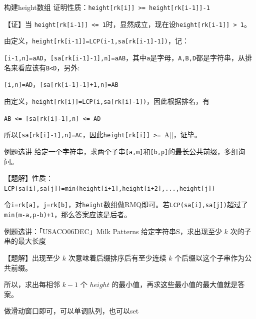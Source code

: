 \documentclass{beamer}
\begin{document}
\begin{frame}[fragile]{构建height数组}
    \small
    证明性质：\verb|height[rk[i]] >= height[rk[i-1]]-1|

    \pause \vspace{1em}
    【证】当 \verb|height[rk[i-1]] <= 1|时，显然成立，现在设\verb|height[rk[i-1]] > 1|。

    由定义，\verb|height[rk[i-1]]=LCP(i-1,sa[rk[i-1]-1])|，记：

    \verb|[i-1,n]=aAD|，\verb|[sa[rk[i-1]-1],n]=aAB|，其中\verb|a|是字母，\verb|A,B,D|都是字符串，从排名来看应该有\verb|B<D|，另外:

    \verb|[i,n]=AD|，\verb|[sa[rk[i-1]-1]+1,n]=AB|

    由定义，\verb|height[rk[i]]=LCP(i,sa[rk[i]-1])|，因此根据排名，有

    \verb|AB <= [sa[rk[i]-1],n] <= AD|

    所以\verb|[sa[rk[i]-1],n]=AC|，因此\verb|height[rk[i]] >= |A||，证毕。
\end{frame}

\begin{frame}[fragile]{例题选讲}
    \small
    给定一个字符串，求两个子串\verb|[a,m]|和\verb|[b,p]|的最长公共前缀，多组询问。

    \vspace{1em}\pause

    【题解】性质：\verb|LCP(sa[i],sa[j])=min(height[i+1],height[i+2],...,height[j])|

    \vspace{1em}\pause
    令\verb|i=rk[a]|，\verb|j=rk[b]|，对\verb|height|数组做RMQ即可。若\verb|LCP(sa[i],sa[j])|超过了\verb|min(m-a,p-b)+1|，那么答案应该是后者。
\end{frame}

\begin{frame}[fragile]{例题选讲：「USACO06DEC」Milk Patterns}
\small
给定字符串S，求出现至少 $k$ 次的子串的最大长度

\vspace{1em}\pause
【题解】出现至少 $k$ 次意味着后缀排序后有至少连续 $k$ 个后缀以这个子串作为公共前缀。

\vspace{1em}\pause
所以，求出每相邻 $k-1$ 个 $height$ 的最小值，再求这些最小值的最大值就是答案。

\vspace{1em}\pause
做滑动窗口即可，可以单调队列，也可以set
\end{frame}
\end{document}
